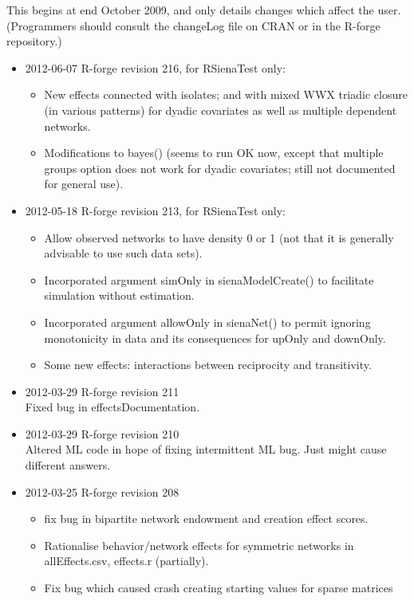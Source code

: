 \documentclass[a4paper,fleqn,11pt]{article}
\newcommand{\+}{\, + \,}
\begin{document}
{This begins at end October 2009, and only details changes which affect the user.
(Programmers should consult the changeLog file on CRAN or in the R-forge
repository.)
\begin{small}
\begin{itemize}
\item 2012-06-07 R-forge revision 216, for RSienaTest only:
\begin{itemize}
  \item New effects connected with isolates; and with mixed WWX triadic closure
      (in various patterns) for dyadic covariates as well as multiple
      dependent networks.
  \item Modifications to bayes() (seems to run OK now, except that multiple
      groups option does not work for dyadic covariates;
      still not documented for general use).
\end{itemize}
\item 2012-05-18 R-forge revision 213, for RSienaTest only:
    \begin{itemize}
     \item Allow observed networks to have density 0 or 1
     (not that it is generally advisable to use such data sets).
     \item Incorporated argument simOnly in sienaModelCreate() to facilitate
	  simulation without estimation.
     \item Incorporated argument allowOnly in sienaNet() to permit
	  ignoring monotonicity in data and its consequences for upOnly and downOnly.
     \item Some new effects: interactions between reciprocity and
       transitivity.
    \end{itemize}
\item 2012-03-29 R-forge revision 211\\
Fixed bug in effectsDocumentation.
\item 2012-03-29 R-forge revision 210\\
Altered ML code in hope of fixing intermittent ML bug. Just might cause
different answers.
\item 2012-03-25 R-forge revision 208
\begin{itemize}
\item fix bug in bipartite network endowment
  and creation effect scores.
\item Rationalise behavior/network effects for symmetric
  networks in allEffects.csv, effects.r (partially).
\item Fix bug which caused crash creating starting values for sparse matrices

\end{itemize}
\end{itemize}
\end{small}}
\end{document}
